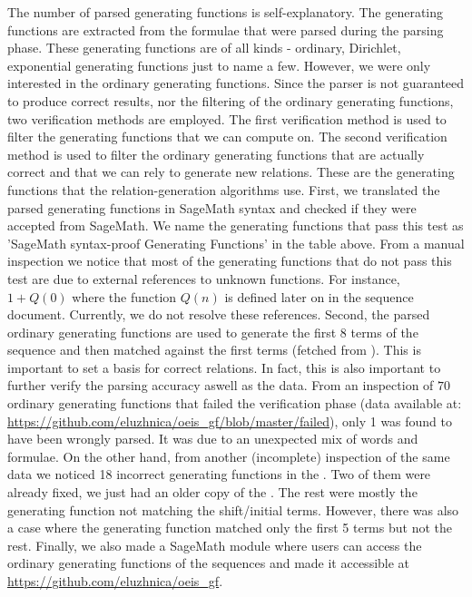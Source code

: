 The number of parsed generating functions is self-explanatory. The generating functions are extracted from the formulae that were parsed during the parsing phase.
These generating functions are of all kinds - ordinary, Dirichlet, exponential generating functions 
just to name a few. However, we were only interested in the ordinary generating functions. 
Since the parser is not guaranteed to produce correct results, nor the filtering of the ordinary
generating functions, two verification methods are employed. The first verification method is used to filter the generating functions that we can compute on. The second verification method is used to 
filter the ordinary generating functions that are actually correct and that we can rely to generate
new relations. These are the generating functions that the relation-generation algorithms use. 
First, we translated the parsed generating functions in SageMath syntax and checked if they were accepted from SageMath. We name the generating functions that pass this test as 'SageMath syntax-proof Generating Functions' in the table above. From a manual inspection we notice that most of the generating functions that do not pass this test are due to external references to unknown functions. For instance, $1+Q(0)$ where the function $Q(n)$ is defined later on in the sequence document. Currently, we do not resolve these references.
Second, the parsed ordinary generating functions are used to generate the first 8 terms of the sequence and then matched against the first terms (fetched from \oeis). This is important to set a basis for correct relations. In fact, this is also
important to further verify the parsing accuracy aswell as the \oeis data. 
From an inspection of $70$ ordinary generating functions that failed the verification phase (data available at: \url{https://github.com/eluzhnica/oeis_gf/blob/master/failed}), only 1 was found to have been wrongly parsed. It was due to an unexpected mix of words and formulae.
On the other hand, from another (incomplete) inspection of the same data we noticed 18 incorrect generating functions in the \oeis.  Two of them were already fixed, we just had an older copy of the \oeis. The rest were mostly the generating function not matching the shift/initial terms. However, there was also a case where the generating function matched only the first 5 terms but not the rest. 
Finally, we also made a SageMath module where users can access the ordinary generating functions of the sequences and made it accessible at \url{https://github.com/eluzhnica/oeis_gf}.

